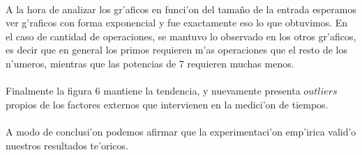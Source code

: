 \paragraph{}
A la hora de analizar los gr'aficos en funci'on del tama\~{n}o de la entrada esperamos ver g'raficos con forma exponencial 
y fue exactamente eso lo que obtuvimos. En el caso de cantidad de operaciones, se mantuvo lo observado en los otros gr'aficos, 
es decir que en general los primos requieren m'as operaciones que el resto de los n'umeros, mientras que las potencias de 7 
requieren muchas menos.
\paragraph{}
Finalmente la figura 6 mantiene la tendencia, y nuevamente presenta $outliers$ propios de los factores externos que intervienen 
en la medici'on de tiempos.
\paragraph{}
A modo de conclusi'on podemos afirmar que la experimentaci'on emp'irica valid'o nuestros resultados te'oricos.
